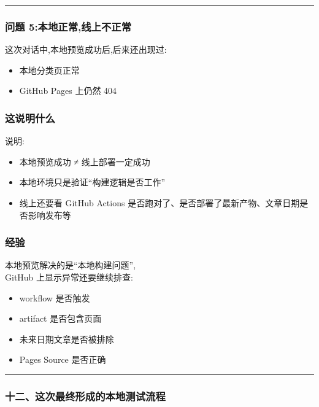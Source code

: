 \documentclass[lang=cn,scheme=chinese,color=blue,device=normal,toc=onecol,math=cm]{elegantbook}
\begin{document}
\medskip\hrule\medskip


\subsubsection{问题 5:本地正常,线上不正常}


这次对话中,本地预览成功后,后来还出现过:\par


\begin{itemize}
\item 本地分类页正常
\item GitHub Pages 上仍然 404
\end{itemize}


\subsubsection{这说明什么}


说明:\par


\begin{itemize}
\item 本地预览成功 ≠ 线上部署一定成功
\item 本地环境只是验证“构建逻辑是否工作”
\item 线上还要看 GitHub Actions 是否跑对了、是否部署了最新产物、文章日期是否影响发布等
\end{itemize}


\subsubsection{经验}


本地预览解决的是“本地构建问题”,\\ GitHub 上显示异常还要继续排查:\par


\begin{itemize}
\item workflow 是否触发
\item artifact 是否包含页面
\item 未来日期文章是否被排除
\item Pages Source 是否正确
\end{itemize}


\medskip\hrule\medskip


\subsubsection{十二、这次最终形成的本地测试流程}
\end{document}
